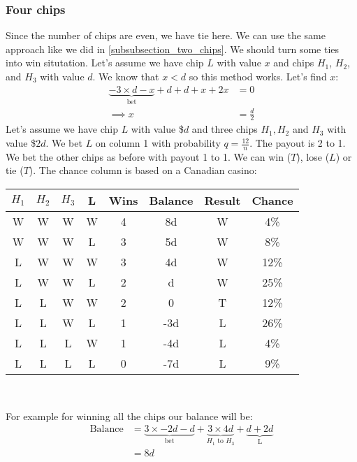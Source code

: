 \documentclass{book}
\begin{document}
	\subsubsection{Four chips}
	Since the number of chips are even, we have tie here. We can use the same approach like we did in \ref{subsubsection_two_chips}. We should turn some ties into win situtation. Let's assume we have chip $L$ with value $x$ and chips $H_1$, $H_2$, and $H_3$ with value $d$. We know that $x < d$ so this method works. Let's find $x$:
	\begin{equation*}
		\begin{split}
			\underbrace{-3 \times d - x}_\text{bet} + d + d +x + 2x &= 0 \\
			\implies x &= \frac{d}{2}
		\end{split}
	\end{equation*}
	Let's assume we have chip $L$ with value \$$d$ and three chips $H_1, H_2$ and $H_3$ with value \$$2d$. We bet $L$ on column 1 with probability $q = \frac{12}{n}$. The payout is 2 to 1. We bet the other chips as before with payout 1 to 1. We can win ($T$), lose ($L$) or tie ($T$). The chance column is based on a Canadian casino: \\
	\par
	\begin{tabular}[h!]{c c c c c c c c}
		\toprule
		$H_1$ & $H_2$ & $H_3$ & L & Wins & Balance & Result & Chance \\
		\midrule
		W & W & W & W & 4 & 8d & W & 4\% \\
		W & W & W & L & 3 & 5d & W & 8\% \\
		L & W & W & W & 3 & 4d & W & 12\% \\
		L & W & W & L & 2 & d & W & 25\% \\
		L & L & W & W & 2 & 0 & T & 12\% \\
		L & L & W & L & 1 & -3d & L & 26\% \\
		L & L & L & W & 1 & -4d & L & 4\% \\
		L & L & L & L & 0 & -7d & L & 9\% \\
		\bottomrule
	\end{tabular} \\	
	\par
	For example for winning all the chips our balance will be:
	\begin{equation*}
		\begin{split}
			\text{Balance} &= \underbrace{3 \times -2d - d}_\text{bet} + \underbrace{3 \times 4d}_\text{$H_1$ to $H_3$} + \underbrace{d + 2d}_\text{L} \\
			&= 8d
		\end{split}
	\end{equation*}
\end{document}
